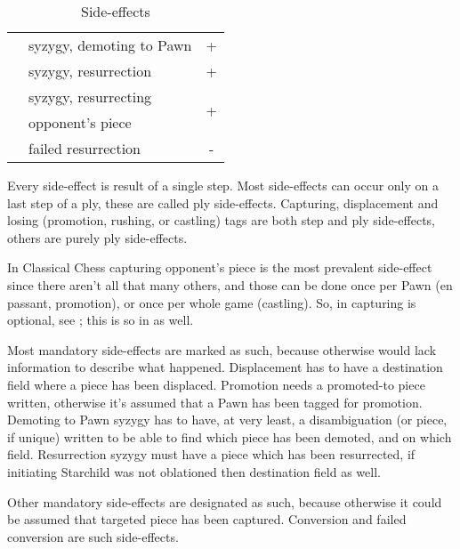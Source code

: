 \begin{table}[!h]
\begin{tabular}{ rlc }
\alg{>}                     & syzygy, demoting to Pawn      & +                     \\
\alg{\$}                    & syzygy, resurrection          & +                     \\
\cmidrule{1-3} %
\multirow{2}{*}{\alg{\$\$}} & syzygy, resurrecting          & \multirow{2}{*}{+}    \\
                            & opponent's piece              &                       \\
\cmidrule{1-3} %
\alg{\$\$\$}                & failed resurrection           & -                     \\
\bottomrule %
\end{tabular}
\caption{Side-effects}
\label{tbl:Appendix/Summary/Side-effects}
\end{table}

Every side-effect is result of a single step. Most side-effects can occur only on
a last step of a ply, these are called ply side-effects. Capturing, displacement
and losing (promotion, rushing, or castling) tags are both step and ply side-effects,
others are purely ply side-effects.

In Classical Chess capturing opponent's piece is the most prevalent side-effect
since there aren't all that many others, and those can be done once per Pawn (en
passant, promotion), or once per whole game (castling). So, in 
capturing is optional, see ; this is so in  as well.

Most mandatory side-effects are marked as such, because otherwise 
would lack information to describe what happened. Displacement has to have a
destination field where a piece has been displaced. Promotion needs a promoted-to
piece written, otherwise it's assumed that a Pawn has been tagged for promotion.
Demoting to Pawn syzygy has to have, at very least, a disambiguation (or piece,
if unique) written to be able to find which piece has been demoted, and on which
field. Resurrection syzygy must have a piece which has been resurrected, if
initiating Starchild was not oblationed then destination field as well.

Other mandatory side-effects are designated as such, because otherwise it could
be assumed that targeted piece has been captured. Conversion and failed conversion
are such side-effects.

